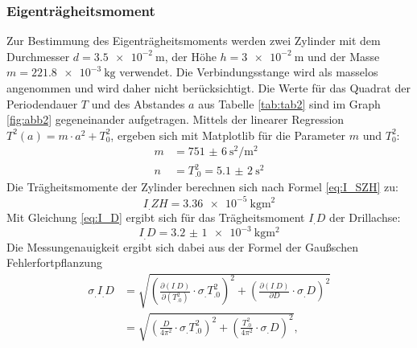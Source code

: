 \subsubsection{Eigenträgheitsmoment}\label{subsubsec:I_D}
Zur Bestimmung des Eigenträgheitsmoments werden zwei Zylinder mit dem Durchmesser $d = \SI{3,5e-2}{\metre}$, der Höhe $h = \SI{3e-2}{\metre}$ und der Masse $m = \SI{221,8e-3}{\kilogram}$ verwendet.\newline
Die Verbindungsstange wird als masselos angenommen und wird daher nicht berücksichtigt.
Die Werte für das Quadrat der Periodendauer $T$ und des Abstandes $a$ aus Tabelle \ref{tab:tab2} sind im Graph \ref{fig:abb2} gegeneinander aufgetragen. Mittels der linearer Regression $T^2(a) = m \cdot a^2 + T_0^2$, ergeben sich mit Matplotlib \cite{matplotlib} für die Parameter $m$ und $T_0^2$:
\begin{align*}
m 	&= \SI{751(6)}{\second\squared\per\metre\squared} \\
n 	&= T_.0^2 = \SI{5,1(2)}{\second\squared}
\end{align*}
Die Trägheitsmomente der Zylinder berechnen sich nach Formel \eqref{eq:I_SZH} zu:
\[I_.{ZH}=\SI{3,36e-5}{\kilogram\metre\squared}\]
Mit Gleichung \eqref{eq:I_D} ergibt sich für das Trägheitsmoment $I_.D$ der Drillachse:
\[I_.D=\SI{3,2(1)e-3}{\kilogram\metre\squared}\]
Die Messungenauigkeit ergibt sich dabei aus der Formel der Gaußschen Fehlerfortpflanzung
\begin{align*}
\sigma_.{I_.D}	&= \sqrt{\left(\frac{\partial (I_.D)}{\partial (T^2_.0)} \cdot \sigma_.{T^2_.0}\right)^2+\left(\frac{\partial (I_.D)}{\partial D}\cdot\sigma_.D\right)^2}\\
				&= \sqrt{\left(\frac{D}{4\pi^2}\cdot\sigma_.{T^2_.0}\right)^2+\left(\frac{T^2_.0}{4\pi^2}\cdot\sigma_.D\right)^2},
\end{align*}
